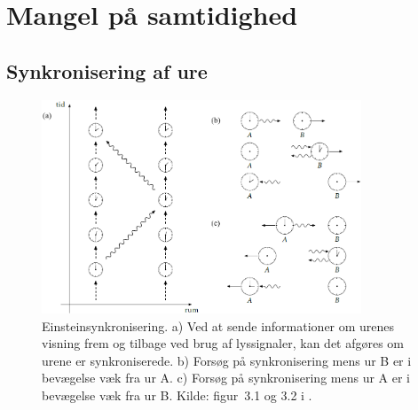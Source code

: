 \section{Mangel på samtidighed}\label{rel:samtidighed}

\subsection{Synkronisering af ure} \label{sec:sync}

\begin{figure}
    \centering
    \includegraphics[width=0.85\textwidth]{SR/billeder/EinsteinSynkronisering.png}
    \caption{Einsteinsynkronisering. a) Ved at sende informationer om urenes
visning frem og tilbage ved brug af lyssignaler, kan det afgøres om urene er synkroniserede. b) Forsøg på synkronisering mens ur B er i bevægelse væk fra ur A. c) Forsøg på synkronisering mens ur A er i bevægelse væk fra ur B. \newline Kilde: figur~3.1 og 3.2 i \cite{uggerhojSpecielRelativitetsteori2016}.}
    \label{fig:EinsteinSyncornization}
\end{figure}

